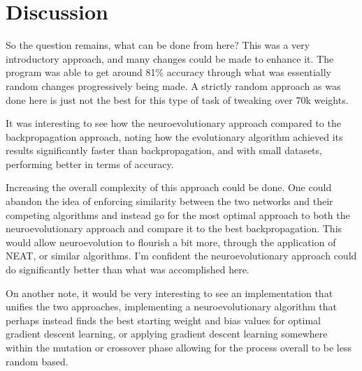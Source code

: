 \documentclass[12pt]{report}
\begin{document}
\section*{Discussion}
So the question remains, what can be done from here?
This was a very introductory approach, and many changes could be made
to enhance it. The program was able to get around 81\% accuracy through what was
essentially random changes progressively being made. A strictly random
approach as was done here is just not the best for this type of task of tweaking
over 70k weights.
\par It was interesting to see how the neuroevolutionary approach compared to
the backpropagation approach, noting how the evolutionary algorithm achieved
its results significantly faster than backpropagation, and with small datasets,
performing better in terms of accuracy.
\par Increasing the overall complexity of this approach could be done. One could
abandon the idea of enforcing similarity between the two networks and their competing
algorithms and
instead go for the most optimal approach to both the neuroevolutionary approach
and compare it to the best backpropagation. This would allow neuroevolution
to flourish a bit more, through the application of NEAT, or similar algorithms.
I'm confident the neuroevolutionary approach could do significantly better than what
was accomplished here.
\par On another note, it would be very interesting to see an implementation that unifies
the two approaches, implementing a neuroevolutionary algorithm that perhaps instead finds
the best starting weight and bias values for optimal gradient descent learning, or 
applying gradient descent learning somewhere within the mutation or crossover phase
allowing for the process overall to be less random based.

%
%
%
\end{document}

